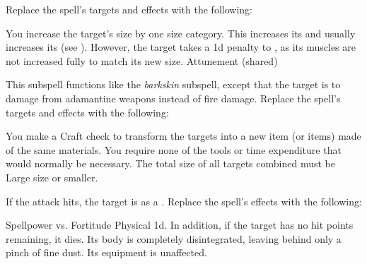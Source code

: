 Replace the spell's targets and effects with the following:
\begin{spellcontent}
\begin{augmenttargetinginfo}
\end{augmenttargetinginfo}
\begin{augmenteffects}
\spelleffect
You increase the target's size by one size category.
This increases its  and usually increases its  (see ).
However, the target takes a \minus1d penalty to , as its muscles are not increased fully to match its new size.
\spelldur Attunement (shared)
\end{augmenteffects}
\end{spellcontent}
This subspell functions like the \textit{barkskin} subspell, except that the target is  to damage from adamantine weapons instead of fire damage.
Replace the spell's targets and effects with the following:
\begin{spellcontent}
\begin{augmenttargetinginfo}
\end{augmenttargetinginfo}
\begin{augmenteffects}
\spelleffect
You make a Craft check to transform the targets into a new item (or items) made of the same materials.
You require none of the tools or time expenditure that would normally be necessary.
The total size of all targets combined must be Large size or smaller.
\end{augmenteffects}
\end{spellcontent}
If the attack hits, the target is  as a .
Replace the spell's effects with the following:
\begin{spellcontent}
\begin{augmenteffects}
\begin{spellattack}{Spellpower vs. Fortitude}
\spellsuccess
Physical  \plus1d.
In addition, if the target has no hit points remaining, it dies.
Its body is completely disintegrated, leaving behind only a pinch of fine dust.
Its equipment is unaffected.
\end{spellattack}
\end{augmenteffects}
\end{spellcontent}

